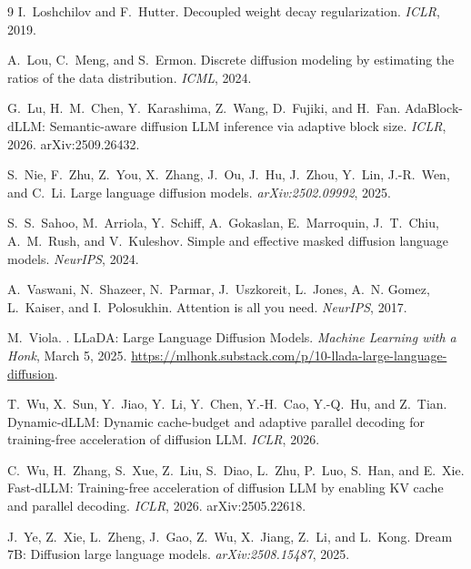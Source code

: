 \documentclass[11pt]{article}
\begin{document}
\begin{thebibliography}{9}
I.~Loshchilov and F.~Hutter.
\newblock Decoupled weight decay regularization.
\newblock \emph{ICLR}, 2019.

A.~Lou, C.~Meng, and S.~Ermon.
\newblock Discrete diffusion modeling by estimating the ratios of the data distribution.
\newblock \emph{ICML}, 2024.

G.~Lu, H.~M.~Chen, Y.~Karashima, Z.~Wang, D.~Fujiki, and H.~Fan.
\newblock AdaBlock-dLLM: Semantic-aware diffusion LLM inference via adaptive block size.
\newblock \emph{ICLR}, 2026. arXiv:2509.26432.

S.~Nie, F.~Zhu, Z.~You, X.~Zhang, J.~Ou, J.~Hu, J.~Zhou, Y.~Lin, J.-R.~Wen, and C.~Li.
\newblock Large language diffusion models.
\newblock \emph{arXiv:2502.09992}, 2025.

S.~S.~Sahoo, M.~Arriola, Y.~Schiff, A.~Gokaslan, E.~Marroquin, J.~T.~Chiu, A.~M.~Rush, and V.~Kuleshov.
\newblock Simple and effective masked diffusion language models.
\newblock \emph{NeurIPS}, 2024.

A.~Vaswani, N.~Shazeer, N.~Parmar, J.~Uszkoreit, L.~Jones, A.~N. Gomez, L.~Kaiser, and I.~Polosukhin.
\newblock Attention is all you need.
\newblock \emph{NeurIPS}, 2017.

M.~Viola.
. LLaDA: Large Language Diffusion Models.
\newblock \emph{Machine Learning with a Honk}, March 5, 2025. \url{https://mlhonk.substack.com/p/10-llada-large-language-diffusion}.

T.~Wu, X.~Sun, Y.~Jiao, Y.~Li, Y.~Chen, Y.-H.~Cao, Y.-Q.~Hu, and Z.~Tian.
\newblock Dynamic-dLLM: Dynamic cache-budget and adaptive parallel decoding for training-free acceleration of diffusion LLM.
\newblock \emph{ICLR}, 2026.

C.~Wu, H.~Zhang, S.~Xue, Z.~Liu, S.~Diao, L.~Zhu, P.~Luo, S.~Han, and E.~Xie.
\newblock Fast-dLLM: Training-free acceleration of diffusion LLM by enabling KV cache and parallel decoding.
\newblock \emph{ICLR}, 2026. arXiv:2505.22618.

J.~Ye, Z.~Xie, L.~Zheng, J.~Gao, Z.~Wu, X.~Jiang, Z.~Li, and L.~Kong.
\newblock Dream 7B: Diffusion large language models.
\newblock \emph{arXiv:2508.15487}, 2025.

\end{thebibliography}
\end{document}
